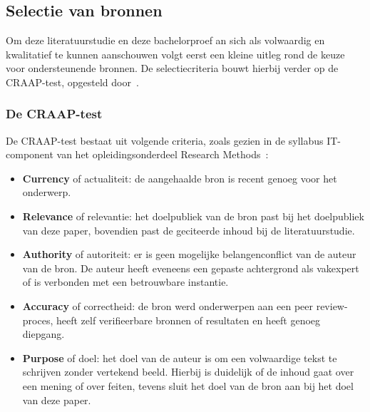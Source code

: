 \chapter{}
\label{ch:stand-van-zaken}



\section{Selectie van bronnen}
\label{sec:selectie-van-bronnen}
Om deze literatuurstudie en deze bachelorproef an sich als volwaardig en kwalitatief te kunnen aanschouwen volgt eerst een kleine uitleg rond de keuze voor ondersteunende bronnen.
De selectiecriteria bouwt hierbij verder op de CRAAP-test, opgesteld door~\textcite{Blakeslee2004}.


\subsection{De CRAAP-test}
\label{subsec:de-craap-test}
De CRAAP-test bestaat uit volgende criteria, zoals gezien in de syllabus IT-component van het opleidingsonderdeel Research Methods~\autocite{Bert2023}:
\begin{itemize}
    \item \textbf{Currency} of actualiteit: de aangehaalde bron is recent genoeg voor het onderwerp.
    \item \textbf{Relevance} of relevantie: het doelpubliek van de bron past bij het doelpubliek van deze paper, bovendien past de geciteerde inhoud bij de literatuurstudie.
    \item \textbf{Authority} of autoriteit: er is geen mogelijke belangenconflict van de auteur van de bron.
    De auteur heeft eveneens een gepaste achtergrond als vakexpert of is verbonden met een betrouwbare instantie.
    \item \textbf{Accuracy} of correctheid: de bron werd onderwerpen aan een peer review-proces, heeft zelf verifieerbare bronnen of resultaten en heeft genoeg diepgang.
    \item \textbf{Purpose} of doel: het doel van de auteur is om een volwaardige tekst te schrijven zonder vertekend beeld.
    Hierbij is duidelijk of de inhoud gaat over een mening of over feiten, tevens sluit het doel van de bron aan bij het doel van deze paper.
\end{itemize}

